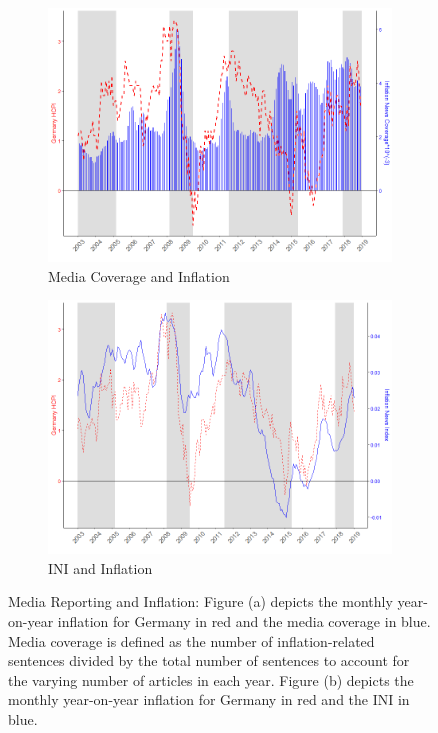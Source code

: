 \documentclass[review]{elsarticle}
\begin{document}
   \begin{figure}[!ht]
    \centering
\begin{subfigure}{6cm}
    \includegraphics{Inflation_Count.png}
    \caption{Media Coverage and Inflation}
    \label{Inflation_Count}
\end{subfigure}
\hfil
\begin{subfigure}{6cm}
    \includegraphics{Inflation_Sentiment_Direction.png}
    \caption{INI and Inflation}
    \label{Inflation_Sentiment_Direction}
\end{subfigure}
\caption{Media Reporting and Inflation: Figure (a) depicts the monthly year-on-year inflation for Germany in red and the media coverage in blue. Media coverage is defined as the number of inflation-related sentences divided by the total number of sentences to account for the varying number of articles in each year. Figure (b) depicts the monthly year-on-year inflation for Germany in red and the INI in blue.}
\label{fig:News Index}
    \end{figure}
\end{document}
